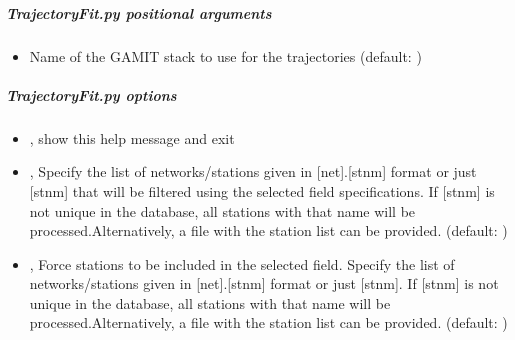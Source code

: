 \documentclass[letterpaper,10pt,english]{sphinxmanual}
\begin{document}
\subparagraph{TrajectoryFit.py positional arguments}
\label{\detokenize{pgamit.com:TrajectoryFit.py-positional-arguments}}\begin{itemize}
\item {} 
\sphinxAtStartPar
{\hyperref[\detokenize{pgamit.com:TrajectoryFit.py-_stack-name_}]{}} \sphinxhyphen{} Name of the GAMIT stack to use for the trajectories (default: )

\end{itemize}


\subparagraph{TrajectoryFit.py options}
\label{\detokenize{pgamit.com:TrajectoryFit.py-options}}\begin{itemize}
\item {} 
\sphinxAtStartPar
{\hyperref[\detokenize{pgamit.com:TrajectoryFit.py--h}]{}}, {\hyperref[\detokenize{pgamit.com:TrajectoryFit.py---help}]{}} \sphinxhyphen{} show this help message and exit

\item {} 
\sphinxAtStartPar
{\hyperref[\detokenize{pgamit.com:TrajectoryFit.py--stn}]{}} , {\hyperref[\detokenize{pgamit.com:TrajectoryFit.py---stations}]{}}  \sphinxhyphen{} Specify the list of networks/stations given in {[}net{]}.{[}stnm{]} format or just {[}stnm{]} that will be filtered using the selected field specifications. If {[}stnm{]} is not unique in the database, all stations with that name will be processed.Alternatively, a file with the station list can be provided. (default: \sphinxcode{\sphinxupquote{{[}{]}}})

\item {} 
\sphinxAtStartPar
{\hyperref[\detokenize{pgamit.com:TrajectoryFit.py--force_stn}]{}} , {\hyperref[\detokenize{pgamit.com:TrajectoryFit.py---force_stations}]{}}  \sphinxhyphen{} Force stations to be included in the selected field. Specify the list of networks/stations given in {[}net{]}.{[}stnm{]} format or just {[}stnm{]}. If {[}stnm{]} is not unique in the database, all stations with that name will be processed.Alternatively, a file with the station list can be provided. (default: \sphinxcode{\sphinxupquote{{[}{]}}})


\end{itemize}
\end{document}
